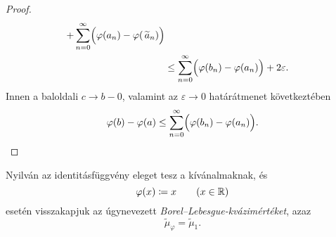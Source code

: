 \documentclass[
]{elteikthesis}[2024/04/26]
\begin{document}
\begin{proof}
\begin{align*}
			 +    \sum_{n=0}^{\infty} \Bigl( \varphi(a_n) - \varphi(\,\widetilde{a}_n) \Bigr) \\
			&\leq \sum_{n=0}^{\infty} \Bigl( \varphi(b_n) - \varphi(a_n) \Bigr)
			+     2 \varepsilon.
		\end{align*}
		Innen a baloldali \( c \to b-0 \), 
		valamint az \( \varepsilon \to 0 \) határátmenet következtében
		\[
			\varphi(b) - \varphi(a) \leq
			\sum_{n=0}^{\infty} \Bigl( \varphi(b_n) - \varphi(a_n) \Bigr).
		\]
	\end{proof}
	
	\begin{note}
		Nyilván az identitásfüggvény eleget tesz a kívánalmaknak, és
		\[
			\varphi(x) \coloneq x \qquad (x \in \mathbb{R})
		\]
		esetén visszakapjuk az úgynevezett \emph{Borel--Lebesgue-kvázimértéket}, azaz
		\[
			\widetilde{\mu}_\varphi = \widetilde{\mu}_1.
		\]
	\end{note}
	
	
\end{document}
